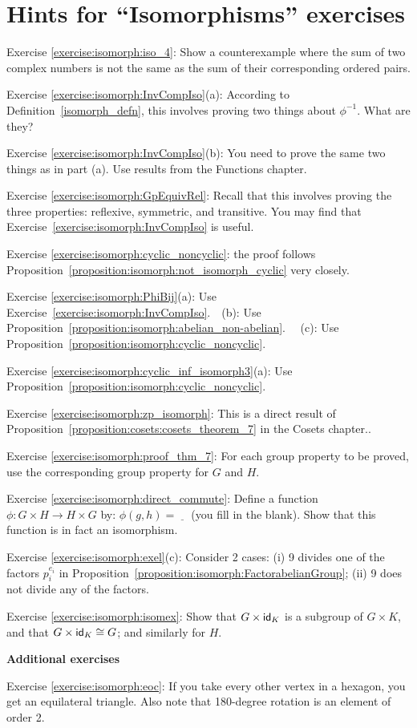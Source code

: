 \section{Hints for ``Isomorphisms'' exercises}\label{sec:isomorph:hints} 


\noindent Exercise \ref{exercise:isomorph:iso_4}:  Show a counterexample where the sum of two complex numbers is not the same as the sum of their corresponding ordered pairs.

\noindent Exercise \ref{exercise:isomorph:InvCompIso}(a):  According to Definition~\ref{isomorph_defn}, this involves proving two things about $\phi^{-1}$.  What are they?

\noindent Exercise \ref{exercise:isomorph:InvCompIso}(b): You need to prove the same two things as in part (a).  Use results from the Functions chapter.

\noindent Exercise \ref{exercise:isomorph:GpEquivRel}:   Recall that this involves proving the three properties: reflexive, symmetric, and transitive. You may find that Exercise~\ref{exercise:isomorph:InvCompIso}  is useful.

\noindent Exercise \ref{exercise:isomorph:cyclic_noncyclic}:   the proof follows Proposition~\ref{proposition:isomorph:not_isomorph_cyclic} very closely.

\noindent Exercise \ref{exercise:isomorph:PhiBij}(a): Use Exercise~\ref{exercise:isomorph:InvCompIso}.~~(b):  Use Proposition~\ref{proposition:isomorph:abelian_non-abelian}. ~~(c):  Use Proposition~\ref{proposition:isomorph:cyclic_noncyclic}. 

\noindent Exercise \ref{exercise:isomorph:cyclic_inf_isomorph3}(a): Use Proposition~\ref{proposition:isomorph:cyclic_noncyclic}.

\noindent Exercise \ref{exercise:isomorph:zp_isomorph}: This  is a direct result of Proposition~\ref{proposition:cosets:cosets_theorem_7} in the Cosets chapter..

\noindent Exercise \ref{exercise:isomorph:proof_thm_7}: For each group property to be proved, use the corresponding group property for $G$ and $H$.


\noindent Exercise \ref{exercise:isomorph:direct_commute}:
 Define a function $\phi:G \times H \rightarrow H \times G$ by:  $\phi(g,h) = \underline{~~~~}$ (you fill in the blank).  Show that this function is in fact an isomorphism. 

\noindent Exercise \ref{exercise:isomorph:exel}(c): Consider 2 cases: (i) 9 divides one of the factors $p_i^{e_i}$ in Proposition~\ref{proposition:isomorph:FactorabelianGroup}; (ii) 9 does not divide any of the factors.

\noindent Exercise \ref{exercise:isomorph:isomex}:  Show that $G \times {\sf{i}d}_K$ is a subgroup of $G \times K$, and that $G \times {\sf{i}d}_K \cong G$; and similarly for $H$.
\medskip

\textbf{Additional exercises}

\noindent Exercise \ref{exercise:isomorph:eoc}: If you take every other vertex in a hexagon, you get an equilateral triangle. Also note that 180-degree rotation is an element of order 2.

